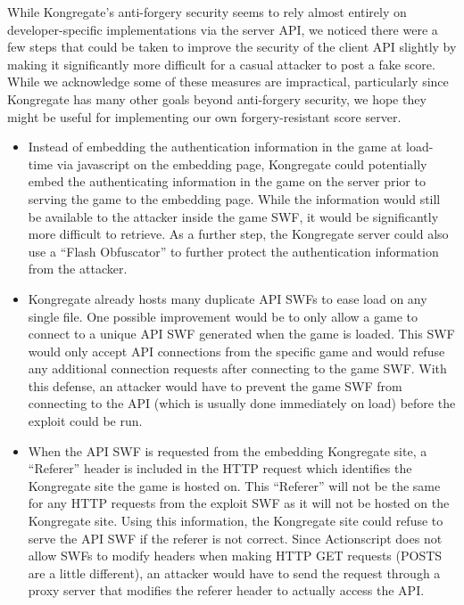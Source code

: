 \documentclass [11pt,twocolumn] {article}
\begin{document}
While Kongregate's anti-forgery security seems to rely almost entirely on developer-specific implementations via the server API, we noticed there were a few steps that could be taken to improve the security of the client API slightly by making it significantly more difficult for a casual attacker to post a fake score. While we acknowledge some of these measures are impractical, particularly since Kongregate has many other goals beyond anti-forgery security, we hope they might be useful for implementing our own forgery-resistant score server.  

\begin {itemize} 

\item Instead of embedding the authentication information in the game at load-time via javascript on the embedding page, Kongregate could potentially embed the authenticating information in the game on the server prior to serving the game to the embedding page. While the information would still be available to the attacker inside the game SWF, it would be significantly more difficult to retrieve. As a further step, the Kongregate server could also use a ``Flash Obfuscator'' to further protect the authentication information from the attacker.

\item Kongregate already hosts many duplicate API SWFs to ease load on any single file. One possible improvement would be to only allow a game to connect to a unique API SWF generated when the game is loaded. This SWF would only accept API connections from the specific game and would refuse any additional connection requests after connecting to the game SWF. With this defense, an attacker would have to prevent the game SWF from connecting to the API (which is usually done immediately on load) before the exploit could be run. 

\item When the API SWF is requested from the embedding Kongregate site, a ``Referer'' header is included in the HTTP request which identifies the Kongregate site the game is hosted on. This ``Referer'' will not be the same for any HTTP requests from the exploit SWF as it will not be hosted on the Kongregate site. Using this information, the Kongregate site could refuse to serve the API SWF if the referer is not correct. Since Actionscript does not allow SWFs to modify headers when making HTTP GET requests (POSTS are a little different), an attacker would have to send the request through a proxy server that modifies the referer header to actually access the API. 

\end {itemize}  
\end{document}
